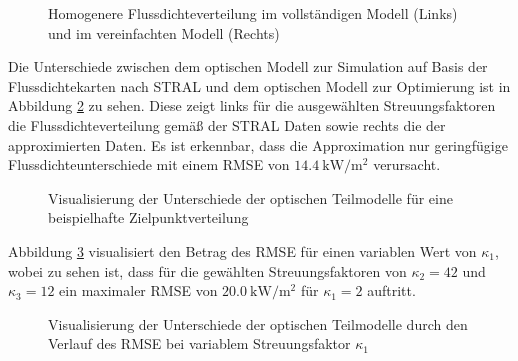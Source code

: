\enlargethispage{\baselineskip}
\begin{figure}[h!]
    \centering
    \setlength{\fboxsep}{1pt}
    \setlength{\fboxrule}{1pt}
    \caption[Homogenere Flussdichteverteilung im vollständigen Modell und im vereinfachten Modell]{Homogenere Flussdichteverteilung im vollständigen Modell (Links) und im vereinfachten Modell (Rechts)}
    \label{fig_dispersionSTRAL36300605}
\end{figure}

Die Unterschiede zwischen dem optischen Modell zur Simulation auf Basis der Flussdichtekarten nach STRAL und dem optischen Modell zur Optimierung ist in Abbildung \ref{fig_UnterschiedoptischeModelle} zu sehen.
Diese zeigt links für die ausgewählten Streuungsfaktoren die Flussdichteverteilung gemäß der STRAL Daten sowie rechts die der approximierten Daten.
Es ist erkennbar, dass die Approximation nur geringfügige Flussdichteunterschiede mit einem RMSE von $\SI{14.4}{\kilo\watt\per\metre\squared}$ verursacht.


\begin{figure}[h!]
    \centering
    \setlength{\fboxsep}{1pt}
    \setlength{\fboxrule}{1pt}
    \caption[Visualisierung der Unterschiede der optischen Teilmodelle für eine beispielhafte Zielpunktverteilung]{Visualisierung der Unterschiede der optischen Teilmodelle für eine beispielhafte Zielpunktverteilung}
    \label{fig_UnterschiedoptischeModelle}
\end{figure}

Abbildung \ref{fig_RMSEüberdispersion} visualisiert den Betrag des RMSE für einen variablen Wert von $\kappa_1$, wobei zu sehen ist, dass für die gewählten Streuungsfaktoren von $\kappa_2 = 42$ und $\kappa_3 = 12$ ein maximaler RMSE von $\SI{20.0}{\kilo\watt\per\metre\squared}$ für $\kappa_1 = 2$ auftritt.

\begin{figure}[h!]
    \centering
    \setlength{\fboxsep}{1pt}
    \setlength{\fboxrule}{1pt}
\caption[Visualisierung der Unterschiede der optischen Teilmodelle durch den Verlauf des RMSE bei variablem Streuungsfaktor $\kappa_1$]{Visualisierung der Unterschiede der optischen Teilmodelle durch den Verlauf des RMSE bei variablem Streuungsfaktor $\kappa_1$}
    \label{fig_RMSEüberdispersion}
\end{figure}

